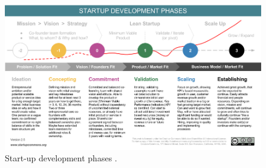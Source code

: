 \documentclass[twoside]{report}
\begin{document}
	\begin{landscape}
		\begin{figure}
			\begin{center}
				\includegraphics[width=\linewidth]{development_phases.png}
				\caption{Start-up development phases \cite{commons_startup_2015}.}
				\label{fig:framework}
			\end{center}
		\end{figure}
	\end{landscape}
\end{document}
